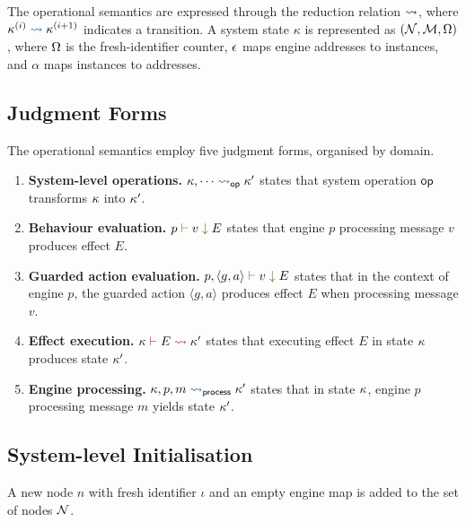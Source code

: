 \documentclass[
  a4paper,        %
  techreport,     %
]{art}
\begin{document}
The operational semantics are expressed through the reduction relation
$\rightsquigarrow$, where
$\sysstep{\SystemState^{(i)}}{\SystemState^{(i+1)}}$ indicates a transition.
A system state $\kappa$ is represented as
$(\mathcal{N}, \mathcal{M}, \Omega)$, where $\Omega$ is the
fresh-identifier counter, $\epsilon$ maps engine addresses to instances,
and $\alpha$ maps instances to addresses.

\subsection{Judgment Forms}\label{sec:judgment-forms}

The operational semantics employ five judgment forms, organised by domain.

\begin{enumerate}
\item \textbf{System-level operations.}
$\opstep{\SystemState, \cdots}{op}{\SystemState'}$
states that system operation $\mathsf{op}$ transforms $\kappa$ into
$\kappa'$.

\item \textbf{Behaviour evaluation.}
$\evalstep{p}{v}{E}$
states that engine $p$ processing message $v$ produces effect $E$.

\item \textbf{Guarded action evaluation.}
$\guardevalmsgstep{p}{g}{a}{v}{E}$
states that in the context of engine $p$, the guarded action
$\langle g, a \rangle$ produces effect $E$ when processing message $v$.

\item \textbf{Effect execution.}
$\effectevalstep{\SystemState}{E}{\SystemState'}$
states that executing effect $E$ in state $\kappa$ produces state
$\kappa'$.

\item \textbf{Engine processing.}
$\processstep{\SystemState}{p}{m}{\SystemState'}$
states that in state $\kappa$, engine $p$ processing message $m$
yields state $\kappa'$.
\end{enumerate}

\subsection{System-level Initialisation}\label{sec:creation-rules}

\begin{definition}\label{rule:s-Node}%
A new node $n$ with fresh identifier $\iota$ and an empty engine map is added
to the set of nodes $\mathcal{N}$.
\begin{prooftree}
\end{prooftree}
\end{definition}
\end{document}
